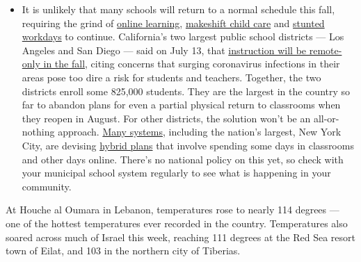 \begin{itemize}
  \begin{itemize}
  \tightlist
  \item
    It is unlikely that many schools will return to a normal schedule
    this fall, requiring the grind of
    \href{https://www.nytimes.com/2020/06/05/us/coronavirus-education-lost-learning.html?action=click\&pgtype=Article\&state=default\&region=MAIN_CONTENT_3\&context=storylines_faq}{online
    learning},
    \href{https://www.nytimes.com/2020/05/29/us/coronavirus-child-care-centers.html?action=click\&pgtype=Article\&state=default\&region=MAIN_CONTENT_3\&context=storylines_faq}{makeshift
    child care} and
    \href{https://www.nytimes.com/2020/06/03/business/economy/coronavirus-working-women.html?action=click\&pgtype=Article\&state=default\&region=MAIN_CONTENT_3\&context=storylines_faq}{stunted
    workdays} to continue. California's two largest public school
    districts --- Los Angeles and San Diego --- said on July 13, that
    \href{https://www.nytimes.com/2020/07/13/us/lausd-san-diego-school-reopening.html?action=click\&pgtype=Article\&state=default\&region=MAIN_CONTENT_3\&context=storylines_faq}{instruction
    will be remote-only in the fall}, citing concerns that surging
    coronavirus infections in their areas pose too dire a risk for
    students and teachers. Together, the two districts enroll some
    825,000 students. They are the largest in the country so far to
    abandon plans for even a partial physical return to classrooms when
    they reopen in August. For other districts, the solution won't be an
    all-or-nothing approach.
    \href{https://bioethics.jhu.edu/research-and-outreach/projects/eschool-initiative/school-policy-tracker/}{Many
    systems}, including the nation's largest, New York City, are
    devising
    \href{https://www.nytimes.com/2020/06/26/us/coronavirus-schools-reopen-fall.html?action=click\&pgtype=Article\&state=default\&region=MAIN_CONTENT_3\&context=storylines_faq}{hybrid
    plans} that involve spending some days in classrooms and other days
    online. There's no national policy on this yet, so check with your
    municipal school system regularly to see what is happening in your
    community.
  \end{itemize}
\end{itemize}

At Houche al Oumara in Lebanon, temperatures rose to nearly 114 degrees
--- one of the hottest temperatures ever recorded in the country.
Temperatures also soared across much of Israel this week, reaching 111
degrees at the Red Sea resort town of Eilat, and 103 in the northern
city of Tiberias.

